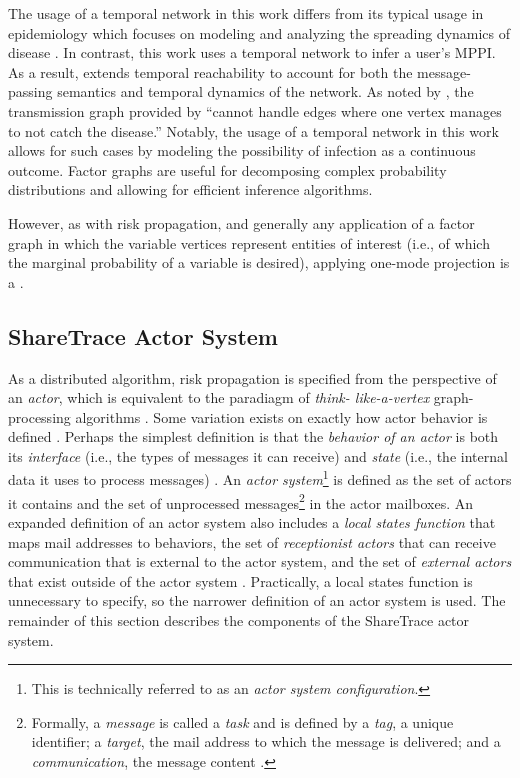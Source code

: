 The usage of a temporal network in this work differs from its typical usage in epidemiology which focuses on modeling and analyzing the spreading dynamics of disease \cite{Riolo2001, Danon2011, Lokhov2014, Craft2015, Pastor-Satorras2015, Koher2019, Zino2021}. In contrast, this work uses a temporal network to infer a user's MPPI. As a result,  extends temporal reachability to account for both the message-passing semantics and temporal dynamics of the network. As noted by \cite{Holme2012}, the transmission graph provided by \cite{Riolo2001} ``cannot handle edges where one vertex manages to not catch the disease.'' Notably, the usage of a temporal network in this work allows for such cases by modeling the possibility of infection as a continuous outcome.
Factor graphs are useful for decomposing complex probability distributions and allowing for efficient inference algorithms.

However, as with risk propagation, and generally any application of a factor graph in which the variable vertices represent entities of interest (i.e., of which the marginal probability of a variable is desired), applying one-mode projection is a .

\subsection{ShareTrace Actor System}

As a distributed algorithm, risk propagation is specified from the perspective of an \emph{actor}, which is equivalent to the paradiagm of \emph{think- like-a-vertex} graph-processing algorithms \cite{McCune2015}. Some variation exists on exactly how actor behavior is defined \cite{AghaThesis1985, Agha1985, Koster2016}. Perhaps the simplest definition is that the \emph{behavior of an actor} is both its \emph{interface} (i.e., the types of messages it can receive) and \emph{state} (i.e., the internal data it uses to process messages) \cite{Koster2016}. An \emph{actor system}\footnote{This is technically referred to as an \emph{actor system configuration}.} is defined as the set of actors it contains and the set of unprocessed messages\footnote{Formally, a \emph{message} is called a \emph{task} and is defined by a \emph{tag}, a unique identifier; a \emph{target}, the mail address to which the message is delivered; and a \emph{communication}, the message content \cite{AghaThesis1985}.} in the actor mailboxes. An expanded definition of an actor system also includes a \emph{local states function} that maps mail addresses to behaviors, the set of \emph{receptionist actors} that can receive communication that is external to the actor system, and the set of \emph{external actors} that exist outside of the actor system \cite{AghaThesis1985, Agha1985}. Practically, a local states function is unnecessary to specify, so the narrower definition of an actor system is used. The remainder of this section describes the components of the ShareTrace actor system.

